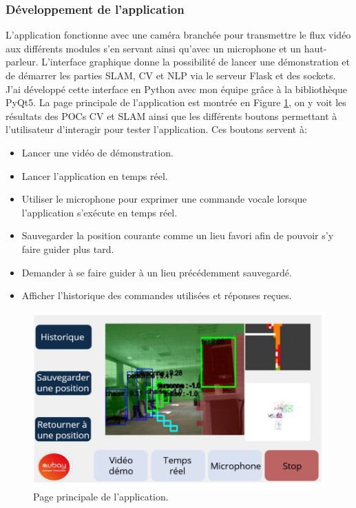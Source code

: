 \documentclass[11pt]{article}
\begin{document}
      \subsubsection{Développement de l'application}         
        L'application fonctionne avec une caméra branchée pour transmettre le flux vidéo aux différents modules s'en servant ainsi qu'avec
        un microphone et un haut-parleur.  
        L'interface graphique donne la possibilité de lancer une démonstration et de démarrer les parties SLAM, CV et NLP via le serveur Flask 
        et des sockets. J'ai développé cette interface en Python avec mon équipe grâce à la bibliothèque PyQt5. La page principale de l'application est
        montrée en Figure \ref{fig:Application}, on y voit les résultats des POCs CV et SLAM ainsi que les différents boutons permettant
        à l'utilisateur d'interagir pour tester l'application. Ces boutons servent à: 

        \begin{itemize}
          \item Lancer une vidéo de démonstration.
          \item Lancer l'application en temps réel.
          \item Utiliser le microphone pour exprimer une commande vocale lorsque l'application s'exécute en temps réel.
          \item Sauvegarder la position courante comme un lieu favori afin de pouvoir s'y faire guider plus tard.
          \item Demander à se faire guider à un lieu précédemment sauvegardé.
          \item Afficher l'historique des commandes utilisées et réponses reçues.   
        \end{itemize} 

        \begin{figure}[hbt]  
          \includegraphics[width=\textwidth]{Application.png}    
          \caption{Page principale de l'application.}
          \label{fig:Application}
        \end{figure}     
\end{document}
